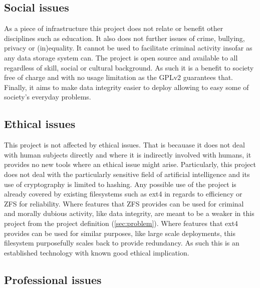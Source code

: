 \begin{appendices}
        \subsection{Social issues}

            As a piece of infrastructure this project does not relate or
            benefit other disciplines such as education. It also does not
            further issues of crime, bullying, privacy or (in)equality. It
            cannot be used to facilitate criminal activity insofar as any data
            storage system can. The project is open source and available to all
            regardless of skill, social or cultural background. As such it is a
            benefit to society free of charge and with no usage limitation as
            the GPLv2 guarantees that. Finally, it aims to make data integrity
            easier to deploy allowing to easy some of society's everyday
            problems.

        \subsection{Ethical issues}

            This project is not affected by ethical issues. That is becauase it
            does not deal with human subjects directly and where it is
            indirectly involved with humans, it provides no new tools where an
            ethical issue might arise. Particularly, this project does not deal
            with the particularly sensitive field of artificial intelligence
            and its use of cryptography is limited to hashing. Any possible use
            of the project is already covered by existing filesystems such as
            ext4 in regards to efficiency or ZFS for reliability. Where
            features that ZFS provides can be used for criminal and morally
            dubious activity, like data integrity, are meant to be a weaker in
            this project from the project definition (\autoref{sec:problem}).
            Where features that ext4 provides can be used for similar purposes,
            like large scale deployments, this filesystem purposefully scales
            back to provide redundancy. As such this is an established
            technology with known good ethical implication.

        \subsection{Professional issues}


\end{appendices}
